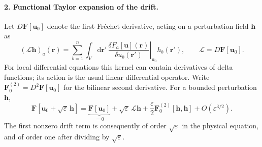 \documentclass{article}
\begin{document}
\paragraph{2. Functional Taylor expansion of the drift.}
Let $D\mathbf F[\mathbf u_0]$ denote the first Fr\'echet derivative, acting on a perturbation field $\mathbf h$ as
\begin{equation}
    (\mathcal L\mathbf h)_a(\mathbf r)
    =\sum_{b=1}^n\int_V\mathrm d\mathbf r'\,
    \left.\frac{\delta F_a[\mathbf u](\mathbf r)}{\delta u_b(\mathbf r')}\right|_{\mathbf u_0}
    h_b(\mathbf r'),\qquad \mathcal L=D\mathbf F[\mathbf u_0].
    \label{eq:appFunctionalJacobian}
\end{equation}
For local differential equations this kernel can contain derivatives of delta functions; its action is the usual linear differential operator. Write $\mathbf F_0^{(2)}=D^2\mathbf F[\mathbf u_0]$ for the bilinear second derivative. For a bounded perturbation $\mathbf h$,
\begin{equation}
    \mathbf F[\mathbf u_0+\sqrt{\varepsilon}\,\mathbf h]
    =\underbrace{\mathbf F[\mathbf u_0]}_{=0}
    +\sqrt{\varepsilon}\,\mathcal L\mathbf h
    +\frac{\varepsilon}{2}\mathbf F_0^{(2)}[\mathbf h,\mathbf h]
    +O(\varepsilon^{3/2}).
    \label{eq:appDriftTaylor}
\end{equation}
The first nonzero drift term is consequently of order $\sqrt{\varepsilon}$ in the physical equation, and of order one after dividing by $\sqrt{\varepsilon}$.
\end{document}
